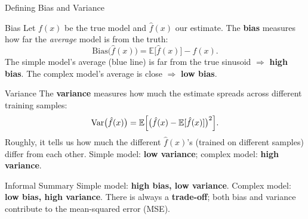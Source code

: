 \documentclass{beamer}
\begin{document}
\begin{frame}[shrink=10]{Defining Bias and Variance}
  \begin{block}{Bias}
    Let $f(x)$ be the true model and $\hat f(x)$ our estimate. The
    \textbf{bias} measures how far the \emph{average} model is from the
    truth:
    \[
      \mathrm{Bias}\bigl(\hat f(x)\bigr)
        = \mathbb{E}\bigl[\hat f(x)\bigr] - f(x).
    \]
    The simple model's average (blue line) is far from the true sinusoid
    $\Rightarrow$ \textbf{high bias}. The complex model's average is close
    $\Rightarrow$ \textbf{low bias}.
  \end{block}

  \begin{block}{Variance}
    The \textbf{variance} measures how much the estimate spreads across
    different training samples:
    \[
      \mathrm{Var}\bigl(\hat f(x)\bigr)
        = \mathbb{E}\Bigl[\bigl(\hat f(x) - \mathbb{E}[\hat f(x)]\bigr)^2\Bigr].
    \]
    Roughly, it tells us how much the different $\hat f(x)$'s (trained on
    different samples) differ from each other. Simple model: \textbf{low
    variance}; complex model: \textbf{high variance}.
  \end{block}

  \begin{alertblock}{Informal Summary}
    Simple model: \textbf{high bias, low variance}.\quad
    Complex model: \textbf{low bias, high variance}.\quad
    There is always a \textbf{trade-off}; both bias and variance contribute
    to the mean-squared error (MSE).
  \end{alertblock}
\end{frame}
\end{document}
